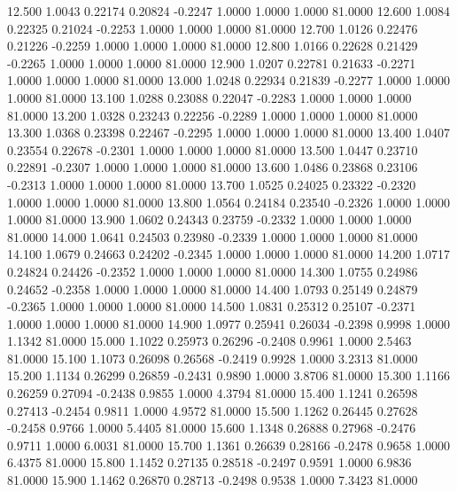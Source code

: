   12.500   1.0043   0.22174   0.20824  -0.2247   1.0000   1.0000   1.0000  81.0000
  12.600   1.0084   0.22325   0.21024  -0.2253   1.0000   1.0000   1.0000  81.0000
  12.700   1.0126   0.22476   0.21226  -0.2259   1.0000   1.0000   1.0000  81.0000
  12.800   1.0166   0.22628   0.21429  -0.2265   1.0000   1.0000   1.0000  81.0000
  12.900   1.0207   0.22781   0.21633  -0.2271   1.0000   1.0000   1.0000  81.0000
  13.000   1.0248   0.22934   0.21839  -0.2277   1.0000   1.0000   1.0000  81.0000
  13.100   1.0288   0.23088   0.22047  -0.2283   1.0000   1.0000   1.0000  81.0000
  13.200   1.0328   0.23243   0.22256  -0.2289   1.0000   1.0000   1.0000  81.0000
  13.300   1.0368   0.23398   0.22467  -0.2295   1.0000   1.0000   1.0000  81.0000
  13.400   1.0407   0.23554   0.22678  -0.2301   1.0000   1.0000   1.0000  81.0000
  13.500   1.0447   0.23710   0.22891  -0.2307   1.0000   1.0000   1.0000  81.0000
  13.600   1.0486   0.23868   0.23106  -0.2313   1.0000   1.0000   1.0000  81.0000
  13.700   1.0525   0.24025   0.23322  -0.2320   1.0000   1.0000   1.0000  81.0000
  13.800   1.0564   0.24184   0.23540  -0.2326   1.0000   1.0000   1.0000  81.0000
  13.900   1.0602   0.24343   0.23759  -0.2332   1.0000   1.0000   1.0000  81.0000
  14.000   1.0641   0.24503   0.23980  -0.2339   1.0000   1.0000   1.0000  81.0000
  14.100   1.0679   0.24663   0.24202  -0.2345   1.0000   1.0000   1.0000  81.0000
  14.200   1.0717   0.24824   0.24426  -0.2352   1.0000   1.0000   1.0000  81.0000
  14.300   1.0755   0.24986   0.24652  -0.2358   1.0000   1.0000   1.0000  81.0000
  14.400   1.0793   0.25149   0.24879  -0.2365   1.0000   1.0000   1.0000  81.0000
  14.500   1.0831   0.25312   0.25107  -0.2371   1.0000   1.0000   1.0000  81.0000
  14.900   1.0977   0.25941   0.26034  -0.2398   0.9998   1.0000   1.1342  81.0000
  15.000   1.1022   0.25973   0.26296  -0.2408   0.9961   1.0000   2.5463  81.0000
  15.100   1.1073   0.26098   0.26568  -0.2419   0.9928   1.0000   3.2313  81.0000
  15.200   1.1134   0.26299   0.26859  -0.2431   0.9890   1.0000   3.8706  81.0000
  15.300   1.1166   0.26259   0.27094  -0.2438   0.9855   1.0000   4.3794  81.0000
  15.400   1.1241   0.26598   0.27413  -0.2454   0.9811   1.0000   4.9572  81.0000
  15.500   1.1262   0.26445   0.27628  -0.2458   0.9766   1.0000   5.4405  81.0000
  15.600   1.1348   0.26888   0.27968  -0.2476   0.9711   1.0000   6.0031  81.0000
  15.700   1.1361   0.26639   0.28166  -0.2478   0.9658   1.0000   6.4375  81.0000
  15.800   1.1452   0.27135   0.28518  -0.2497   0.9591   1.0000   6.9836  81.0000
  15.900   1.1462   0.26870   0.28713  -0.2498   0.9538   1.0000   7.3423  81.0000
